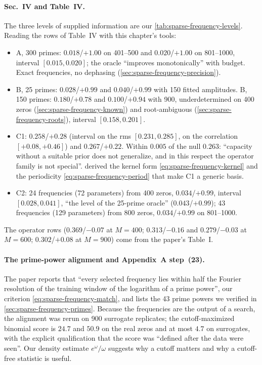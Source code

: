 \paragraph{Sec.~IV and Table~IV.} The three levels of supplied information are our \cref{tab:sparse-frequency-levels}. Reading the rows of Table~IV with this chapter's tools:
\begin{itemize}
\item A, 300 primes: $0.018$/$+1.00$ on 401--500 and $0.020$/$+1.00$ on 801--1000, interval $[0.015,0.020]$; the oracle ``improves monotonically'' with budget. Exact frequencies, no dephasing (\cref{sec:sparse-frequency-precision}).
\item B, 25 primes: $0.028$/$+0.99$ and $0.040$/$+0.99$ with 150 fitted amplitudes. B, 150 primes: $0.180$/$+0.78$ and $0.100$/$+0.94$ with 900, underdetermined on 400 zeros (\cref{sec:sparse-frequency-known}) and root-ambiguous (\cref{sec:sparse-frequency-roots}), interval $[0.158,0.201]$.
\item C1: $0.258$/$+0.28$ (interval on the rms $[0.231,0.285]$, on the correlation $[+0.08,+0.46]$) and $0.267$/$+0.22$. Within $0.005$ of the null $0.263$: ``capacity without a suitable prior does not generalize, and in this respect the operator family is not special''.  derived the kernel form \eqref{eq:sparse-frequency-kernel} and the periodicity \eqref{eq:sparse-frequency-period} that make C1 a generic basis.
\item C2: 24 frequencies (72 parameters) from 400 zeros, $0.034$/$+0.99$, interval $[0.028,0.041]$, ``the level of the 25-prime oracle'' ($0.043$/$+0.99$); 43 frequencies (129 parameters) from 800 zeros, $0.034$/$+0.99$ on 801--1000.
\end{itemize}
The operator rows ($0.369$/$-0.07$ at $M=400$; $0.313$/$-0.16$ and $0.279$/$-0.03$ at $M=600$; $0.302$/$+0.08$ at $M=900$) come from the paper's Table~I.

\paragraph{The prime-power alignment and Appendix~A step~(23).} The paper reports that ``every selected frequency lies within half the Fourier resolution of the training window of the logarithm of a prime power'', our criterion \eqref{eq:sparse-frequency-match}, and lists the 43 prime powers we verified in \cref{sec:sparse-frequency-primes}. Because the frequencies are the output of a search, the alignment was rerun on 900 surrogate replicates; the cutoff-maximized binomial score is $24.7$ and $50.9$ on the real zeros and at most $4.7$ on surrogates, with the explicit qualification that the score was ``defined after the data were seen''. Our density estimate $e^\omega/\omega$ suggests why a cutoff matters and why a cutoff-free statistic is useful.

